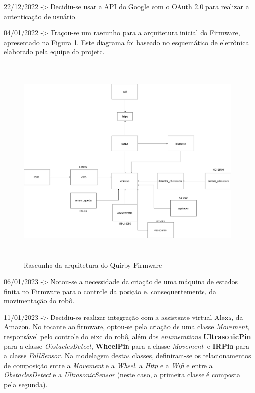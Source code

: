 22/12/2022 -> Decidiu-se usar a API do Google com o OAuth 2.0 para realizar a autenticação de usuário.

04/01/2022 -> Traçou-se um rascunho para a arquitetura inicial do Firmware, apresentado na Figura \ref{fig:memorial:rascunho_arquitetura}. Este diagrama foi baseado no \href{https://drive.google.com/file/d/1-Vf_cmyCznhIBBIicrbw6bcqnTKv2jFa/view?usp=sharing}{esquemático de eletrônica} elaborado pela equipe do projeto. 

\begin{figure}
    \centering
    \includegraphics[height=10.5cm]{figuras/software/Memorial/1.png}
    \caption{Rascunho da arquitetura do Quirby Firmware}
    \label{fig:memorial:rascunho_arquitetura}
\end{figure}

06/01/2023 -> Notou-se a necessidade da criação de uma máquina de estados finita no Firmware para o controle da posição e, consequentemente, da movimentação do robô. 

11/01/2023 -> Decidiu-se realizar integração com a assistente virtual Alexa, da Amazon. No tocante ao firmware, optou-se pela criação de uma classe \textit{Movement}, responsável pelo controle do eixo do robô, além dos \textit{enumerations} \textbf{UltrasonicPin} para a classe \textit{ObstaclesDetect}, \textbf{WheelPin} para a classe \textit{Movement}, e \textbf{IRPin} para a classe \textit{FallSensor}. Na modelagem destas classes, definiram-se os relacionamentos de composição entre a \textit{Movement} e a \textit{Wheel}, a \textit{Http} e a \textit{Wifi} e entre a \textit{ObstaclesDetect} e a \textit{UltrasonicSensor} (neste caso, a primeira classe é composta pela segunda).

